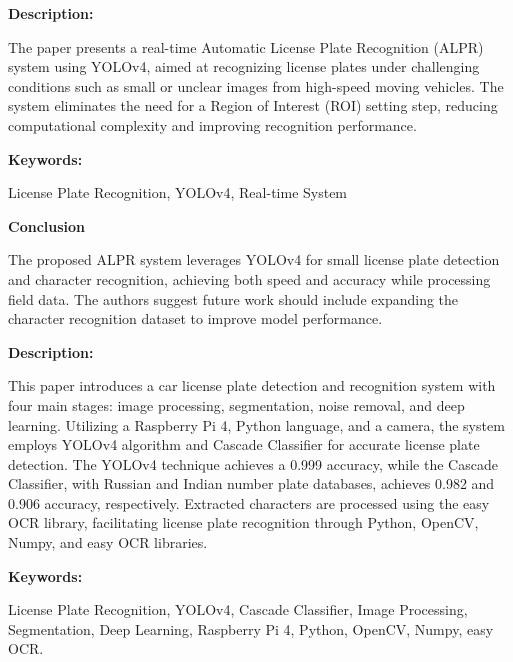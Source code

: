 { 
	
	\textbf{Description:}
	
	
	The paper presents a real-time Automatic License Plate Recognition (ALPR) system using YOLOv4, aimed at recognizing license plates under challenging conditions such as small or unclear images from high-speed moving vehicles. The system eliminates the need for a Region of Interest (ROI) setting step, reducing computational complexity and improving recognition performance.\autocite{Sung:2020}
	
	
	
	\textbf{Keywords:} 
	
	License Plate Recognition, YOLOv4, Real-time System
	
	
	\textbf{Conclusion} 
	
	The proposed ALPR system leverages YOLOv4 for small license plate detection and character recognition, achieving both speed and accuracy while processing field data. The authors suggest future work should include expanding the character recognition dataset to improve model performance.
	}


{ 
	
	\textbf{Description:}
		
	This paper introduces a car license plate detection and recognition system with four main stages: image processing, segmentation, noise removal, and deep learning. Utilizing a Raspberry Pi 4, Python language, and a camera, the system employs YOLOv4 algorithm and Cascade Classifier for accurate license plate detection. The YOLOv4 technique achieves a 0.999 accuracy, while the Cascade Classifier, with Russian and Indian number plate databases, achieves 0.982 and 0.906 accuracy, respectively. Extracted characters are processed using the easy OCR library, facilitating license plate recognition through Python, OpenCV, Numpy, and easy OCR libraries.\autocite{Aljelaw:2022}	

	\textbf{Keywords:} 
	
	License Plate Recognition, YOLOv4, Cascade Classifier, Image Processing, Segmentation, Deep Learning, Raspberry Pi 4, Python, OpenCV, Numpy, easy OCR.

}



